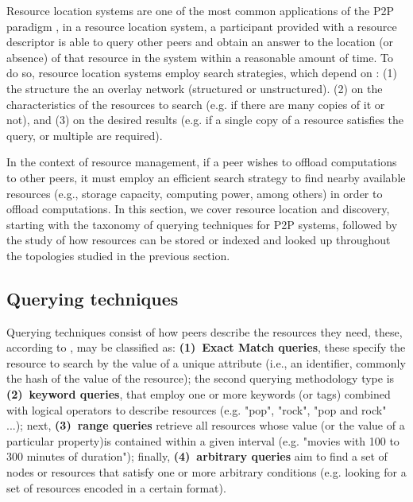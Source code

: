 

Resource location systems are one of the most common applications of the P2P paradigm \cite{leitaoPHDthesis}, in a resource location system, a participant provided with a resource descriptor is able to query other peers and obtain an answer to the location (or absence) of that resource in the system within a reasonable amount of time. To do so, resource location systems employ search strategies, which depend on : (1) the structure the an overlay network (structured or unstructured). (2) on the characteristics of the resources to search (e.g. if there are many copies of it or not), and (3) on the desired results (e.g. if a single copy of a resource satisfies the query, or multiple are required). 

In the context of resource management, if a peer wishes to offload computations to other peers, it must employ an efficient search strategy to find nearby available resources (e.g., storage capacity, computing power, among others) in order to offload computations. In this section, we cover resource location and discovery, starting with the taxonomy of querying techniques for P2P systems, followed by the study of how resources can be stored or indexed and looked up throughout the topologies studied in the previous section.

\subsection{Querying techniques}

Querying techniques consist of how peers describe the resources they need, these, according to \cite{leitaoPHDthesis}, may be classified as: \textbf{(1)~Exact Match queries}, these specify the resource to search by the value of a unique attribute (i.e., an identifier, commonly the hash of the value of the resource); the second querying methodology type is \textbf{(2)~keyword queries}, that employ one or more keywords (or tags) combined with logical operators to describe resources (e.g. "pop", "rock", "pop and rock" ...); next, \textbf{(3)~range queries} retrieve all resources whose value (or the value of a particular property)is contained within a given interval (e.g. "movies with 100 to 300 minutes of duration"); finally, \textbf{(4)~arbitrary queries} aim to find a set of nodes or resources that satisfy one or more arbitrary conditions (e.g. looking for a set of resources encoded in a certain format).

